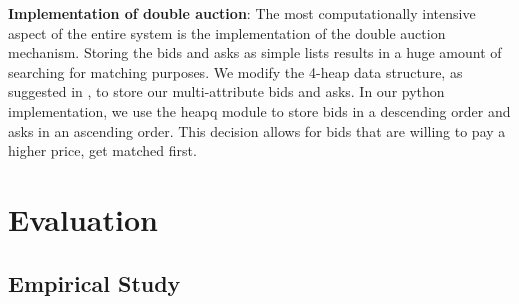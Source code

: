 \documentclass[10pt,journal,compsoc]{IEEEtran}
\begin{document}
\textbf{Implementation of double auction}: The most computationally intensive aspect of the entire system is the implementation of the double auction mechanism. Storing the bids and asks as simple lists results in a huge amount of searching for matching purposes. We modify the 4-heap data structure, as suggested in \cite{Wurman1998Flexible}, to store our multi-attribute bids and asks. In our python implementation, we use the heapq module to store bids in a descending order and asks in an ascending order. This decision allows for bids that are willing to pay a higher price, get matched first. 

\section{Evaluation}
\subsection{Empirical Study}
\end{document}
